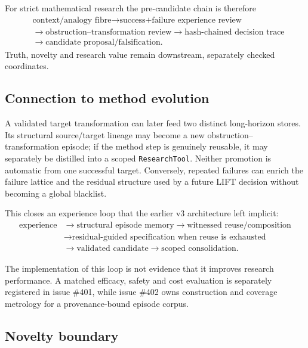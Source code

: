 For strict mathematical research the pre-candidate chain is therefore
\begin{equation}
\begin{aligned}
&\text{context/analogy fibre}
\rightarrow \text{success+failure experience review}\\
&\rightarrow \text{obstruction--transformation review}
\rightarrow \text{hash-chained decision trace}\\
&\rightarrow \text{candidate proposal/falsification}.
\end{aligned}
\end{equation}
Truth, novelty and research value remain downstream, separately checked coordinates.

\subsection{Connection to method evolution}

A validated target transformation can later feed two distinct long-horizon stores. Its structural source/target lineage may become a new obstruction--transformation episode; if the method step is genuinely reusable, it may separately be distilled into a scoped \texttt{ResearchTool}. Neither promotion is automatic from one successful target. Conversely, repeated failures can enrich the failure lattice and the residual structure used by a future LIFT decision without becoming a global blacklist.

This closes an experience loop that the earlier v3 architecture left implicit:
\begin{equation}
\begin{aligned}
\text{experience}
&\rightarrow \text{structural episode memory}
\rightarrow \text{witnessed reuse/composition}\\
&\rightarrow \text{residual-guided specification when reuse is exhausted}\\
&\rightarrow \text{validated candidate}
\rightarrow \text{scoped consolidation}.
\end{aligned}
\end{equation}

The implementation of this loop is not evidence that it improves research performance. A matched efficacy, safety and cost evaluation is separately registered in issue \#401, while issue \#402 owns construction and coverage metrology for a provenance-bound episode corpus.

\subsection{Novelty boundary}

